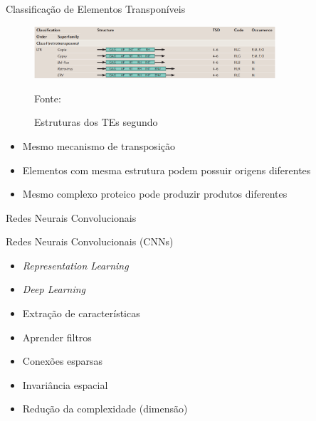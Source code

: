 \documentclass[%
  xcolor=table,%
  10pt,%
  aspectratio = 169,%
  compress,%
  t,%
]{beamer}%
\begin{document}
\begin{frame}{}{Classificação de Elementos Transponíveis}
    \begin{figure}
        \centering
        \includegraphics[width=0.8\textwidth]{./Figuras/LTR-structures.png}
        \caption{Estruturas dos TEs segundo \cite{Wicker2007}}
        \scriptsize Fonte: \cite{Wicker2007}
        \label{fig:ltr-structures}
    \end{figure}
    \begin{itemize}
        \item Mesmo mecanismo de transposição
        \item Elementos com mesma estrutura podem possuir origens diferentes
        \item Mesmo complexo proteico pode produzir produtos diferentes
    \end{itemize}
\end{frame}

\begin{frame}{}{Redes Neurais Convolucionais}
    \begin{block}{Redes Neurais Convolucionais (CNNs)}
        \begin{itemize}
            \item \textit{Representation Learning}
            \item \textit{Deep Learning}
            \item Extração de características
            \item Aprender filtros 
            \item Conexões esparsas
            \item Invariância espacial
            \item Redução da complexidade (dimensão)
        \end{itemize}
    \end{block}
\end{frame}
\end{document}
